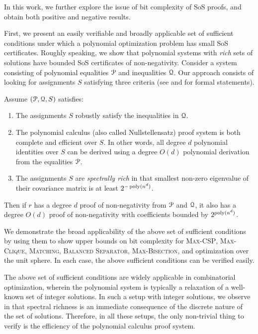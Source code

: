 \documentclass[a4paper,UKenglish]{lipics-v2016}
\begin{document}
In this work, we further explore the issue of bit complexity of SoS proofs, and obtain both positive and negative results.

First, we present an easily verifiable and broadly applicable set of sufficient conditions under which a polynomial optimization problem has small SoS certificates.
Roughly speaking, we show that polynomial systems with {\it rich} sets of solutions have bounded SoS certificates of non-negativity.
Consider a system consisting of polynomial equalities $\mathcal P$ and inequalities $\mathcal Q$.  Our approach consists of looking for assignments $S$ satisfying three criteria (see  and  for formal statements).  
\begin{theorem}
Assume $(\mathcal P, \mathcal Q, S)$ satisfies:
\begin{enumerate}
\item The assignments $S$ robustly satisfy the inequalities in $\mathcal Q$.  
\item The polynomial calculus (also called Nullstellensatz) proof system is both complete and efficient over $S$.  In other words, all degree $d$ polynomial identities over $S$ can be derived using a degree $O(d)$ polynomial derivation from the equalities $\mathcal P$.
\item The assignments $S$ are {\it spectrally rich} in that smallest non-zero eigenvalue of their covariance matrix is at least $2^{-\operatorname{poly}(n^d)}$. 
\end{enumerate}
Then if $r$ has a degree $d$ proof of non-negativity from $\mathcal P$ and $\mathcal Q$, it also has a degree $O(d)$ proof of non-negativity with coefficients bounded by $2^{\operatorname{poly}(n^d)}$.
\end{theorem}

We demonstrate the broad applicability of the above set of sufficient conditions by using them to show upper bounds on bit complexity for \textsc{Max-CSP}, \textsc{Max-Clique}, \textsc{Matching}, \textsc{Balanced Separator}, \textsc{Max-Bisection}, and optimization over the unit sphere.  In each case, the above sufficient conditions can be verified easily. 

The above set of sufficient conditions are widely applicable in combinatorial optimization, wherein the polynomial system is typically a relaxation of a well-known set of integer solutions.  
In such a setup with integer solutions, we observe in  that spectral richness is an immediate consequence of the discrete nature of the set of solutions.
Therefore, in all these setups, the only non-trivial thing to verify is the efficiency of the polynomial calculus proof system.
\end{document}
